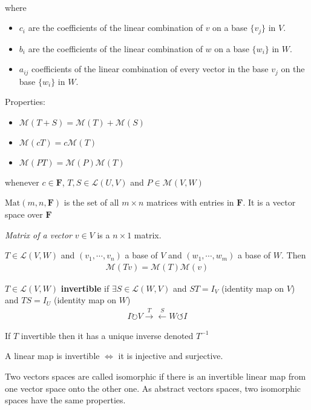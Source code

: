 \begin{description}
\begin{align*}
  \end{align*} where
  \begin{itemize}
  \item $c_i$ are the coefficients of the linear combination of $v$ on a base $\{v_j\}$ in $V$.
  \item $b_i$ are the coefficients of the linear combination of $w$ on a base $\{w_i\}$ in $W$.
  \item $a_{ij}$ coefficients of the linear combination of every vector in the base $v_j$ on the base $\{w_i\}$ in $W$.
  \end{itemize}
  Properties:
  \begin{itemize}
  \item $\mathcal{M}(T+S) = \mathcal{M}(T) + \mathcal{M}(S)$
  \item $\mathcal{M}(cT) = c\mathcal{M}(T)$
  \item $\mathcal{M}(PT) = \mathcal{M}(P)\mathcal{M}(T)$
  \end{itemize}
  whenever $c\in\mathbf{F}$, $T,S\in\mathcal{L}(U,V)$ and  $P\in\mathcal{M}(V,W)$
  \item $\mathrm{Mat}(m,n,\mathbf{F})$ is the set of all $m\times n$ matrices with entries in $\mathbf{F}$. It is a vector space over $\mathbf{F}$
  \item \emph{Matrix of a vector} $v\in V$ is a $n\times 1$ matrix.
  \item[P14] $T\in\mathcal{L}(V,W)$ and $(v_1,\cdots,v_n)$ a base of $V$ and $(w_1,\cdots,w_m)$ a base of $W$. Then
  \begin{align*}
  \mathcal{M}(Tv) =\mathcal{M}(T)\mathcal{M}(v) 
  \end{align*}
  \item[Invertibility\label{itm:D3_invertible_operator}] $T\in\mathcal{L}(V,W)$ \textbf{invertible} if $\exists S\in\mathcal{L}(W,V)$ and $ST=I_V$ (identity map on $V$) and $TS=I_U$ (identity map on $W$) 
  \begin{align*}
  I \circlearrowright V \xrightarrow{T}\xleftarrow{S} W \circlearrowleft I
  \end{align*}
  \item If $T$ invertible then it has a unique inverse denoted $T^{-1}$ 
  \item[P17] A linear map is invertible $\iff$ it is injective and surjective.
  
  \item[Isomorphic] Two vectors spaces are called isomorphic if there is an invertible linear map from one vector space onto the other one. As abstract vectors spaces, two isomorphic spaces have the same properties.
  

\end{description}
